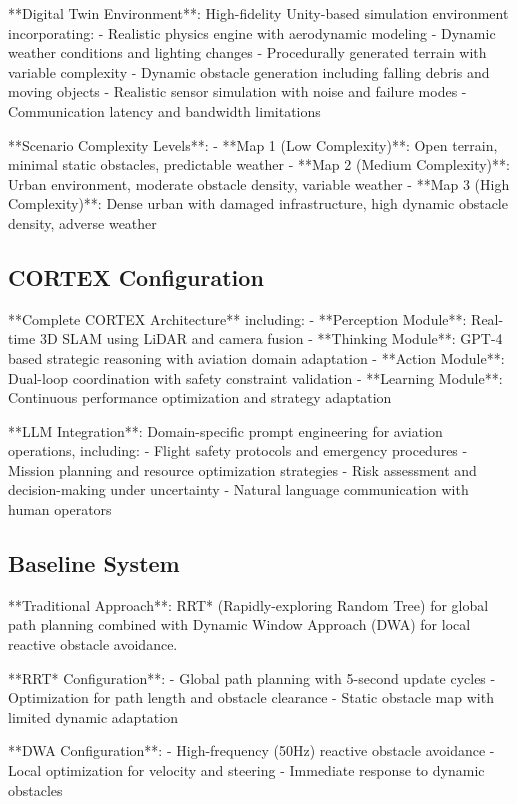 **Digital Twin Environment**: High-fidelity Unity-based simulation environment incorporating:
- Realistic physics engine with aerodynamic modeling
- Dynamic weather conditions and lighting changes
- Procedurally generated terrain with variable complexity
- Dynamic obstacle generation including falling debris and moving objects
- Realistic sensor simulation with noise and failure modes
- Communication latency and bandwidth limitations

**Scenario Complexity Levels**:
- **Map 1 (Low Complexity)**: Open terrain, minimal static obstacles, predictable weather
- **Map 2 (Medium Complexity)**: Urban environment, moderate obstacle density, variable weather
- **Map 3 (High Complexity)**: Dense urban with damaged infrastructure, high dynamic obstacle density, adverse weather

\subsection{CORTEX Configuration}

**Complete CORTEX Architecture** including:
- **Perception Module**: Real-time 3D SLAM using LiDAR and camera fusion
- **Thinking Module**: GPT-4 based strategic reasoning with aviation domain adaptation
- **Action Module**: Dual-loop coordination with safety constraint validation
- **Learning Module**: Continuous performance optimization and strategy adaptation

**LLM Integration**: Domain-specific prompt engineering for aviation operations, including:
- Flight safety protocols and emergency procedures
- Mission planning and resource optimization strategies
- Risk assessment and decision-making under uncertainty
- Natural language communication with human operators

\subsection{Baseline System}

**Traditional Approach**: RRT* (Rapidly-exploring Random Tree) for global path planning combined with Dynamic Window Approach (DWA) for local reactive obstacle avoidance.

**RRT* Configuration**:
- Global path planning with 5-second update cycles
- Optimization for path length and obstacle clearance
- Static obstacle map with limited dynamic adaptation

**DWA Configuration**:
- High-frequency (50Hz) reactive obstacle avoidance
- Local optimization for velocity and steering
- Immediate response to dynamic obstacles

